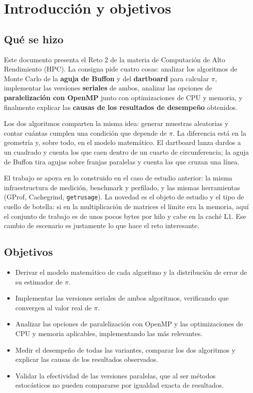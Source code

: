 \section{Introducción y objetivos}

\subsection*{Qué se hizo}

Este documento presenta el Reto 2 de la materia de Computación de Alto Rendimiento (HPC). La consigna pide cuatro cosas: analizar los algoritmos de Monte Carlo de la \textbf{aguja de Buffon} y del \textbf{dartboard} para calcular $\pi$, implementar las versiones \textbf{seriales} de ambos, analizar las opciones de \textbf{paralelización con OpenMP} junto con optimizaciones de CPU y memoria, y finalmente explicar las \textbf{causas de los resultados de desempeño} obtenidos.

Los dos algoritmos comparten la misma idea: generar muestras aleatorias y contar cuántas cumplen una condición que depende de $\pi$. La diferencia está en la geometría y, sobre todo, en el modelo matemático. El dartboard lanza dardos a un cuadrado y cuenta los que caen dentro de un cuarto de circunferencia; la aguja de Buffon tira agujas sobre franjas paralelas y cuenta las que cruzan una línea.

El trabajo se apoya en lo construido en el caso de estudio anterior: la misma infraestructura de medición, benchmark y perfilado, y las mismas herramientas (GProf, Cachegrind, \texttt{getrusage}). La novedad es el objeto de estudio y el tipo de cuello de botella: si en la multiplicación de matrices el límite era la memoria, aquí el conjunto de trabajo es de unos pocos bytes por hilo y cabe en la caché L1. Ese cambio de escenario es justamente lo que hace el reto interesante.

\subsection*{Objetivos}

\begin{itemize}
    \item Derivar el modelo matemático de cada algoritmo y la distribución de error de su estimador de $\pi$.
    \item Implementar las versiones seriales de ambos algoritmos, verificando que convergen al valor real de $\pi$.
    \item Analizar las opciones de paralelización con OpenMP y las optimizaciones de CPU y memoria aplicables, implementando las más relevantes.
    \item Medir el desempeño de todas las variantes, comparar los dos algoritmos y explicar las causas de los resultados observados.
    \item Validar la efectividad de las versiones paralelas, que al ser métodos estocásticos no pueden compararse por igualdad exacta de resultados.
\end{itemize}

